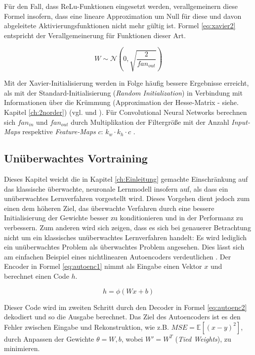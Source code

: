 Für den Fall, dass ReLu-Funktionen eingesetzt werden, verallgemeinern \cite{He2015} diese Formel insofern, dass eine lineare Approximation um Null für diese und davon abgeleitete Aktivierungsfunktionen nicht mehr gültig ist. Formel \ref{eq:xavier2} entspricht der Verallgemeinerung für Funktionen dieser Art. 

\begin{equation}
\label{eq:xavier2} 
W \sim \mathcal{N} (0,\sqrt{\frac{2}{fan_{out}}})
\end{equation}

Mit der Xavier-Initialisierung werden in Folge häufig bessere Ergebnisse erreicht, als mit der Standard-Initialisierung (\textit{Random Initialization}) in Verbindung mit Informationen über die Krümmung (Approximation der Hesse-Matrix - siehe. Kapitel \ref{ch:2norder}) (vgl. \cite{Chapelle11} und \cite{Glorot2010}).
Für Convolutional Neural Networks berechnen sich \textit{$fan_{in}$} und \textit{$fan_{out}$} durch Multiplikation der Filtergröße mit der Anzahl \textit{Input-Maps} respektive \textit{Feature-Maps} $c$: $k_w \cdot k_h \cdot c$ \cite[vgl.][]{He2015}.


\subsection{Unüberwachtes Vortraining}
Dieses Kapitel weicht die in Kapitel \ref{ch:Einleitung} gemachte Einschränkung auf das klassische überwachte, neuronale Lernmodell insofern auf, als dass ein un\-über\-wach\-tes Lernverfahren vorgestellt wird. Dieses Vorgehen dient jedoch zum einen dem höheren Ziel, das überwachte Verfahren durch eine bessere Initialisierung der Gewichte besser zu konditionieren und in der Performanz zu verbessern. Zum anderen wird sich zeigen, dass es sich bei genauerer Betrachtung nicht um ein klassisches un\-über\-wach\-tes Lernverfahren handelt: Es wird lediglich ein un\-über\-wach\-tes Problem als überwachtes Problem angesehen. 
Dies lässt sich am einfachen Beispiel eines nichtlinearen Autoencoders verdeutlichen \cite[vgl. hierzu und im Folgenden][]{Masci2011}. Der Encoder in Formel \ref{eq:autoenc1} nimmt als Eingabe einen Vektor $x$ und berechnet einen Code $h$.
  
\begin{equation}
\label{eq:autoenc1} 
h = \phi(Wx + b)
\end{equation}

Dieser Code wird im zweiten Schritt durch den Decoder in Formel \ref{eq:autoenc2} dekodiert und so die Ausgabe berechnet. Das Ziel des Autoencoders ist es den Fehler zwischen Eingabe und Rekonstruktion, wie z.B. $MSE = \mathbb{E} [ (x - y)^2 ]$, durch Anpassen der Gewichte $ \theta={W,b} $, wobei $W' = W^T$ (\textit{Tied Weights}), zu minimieren.
 
